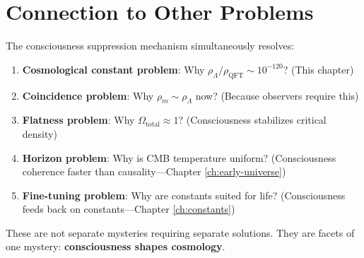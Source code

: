 \section{Connection to Other Problems}

The consciousness suppression mechanism simultaneously resolves:

\begin{enumerate}
\item \textbf{Cosmological constant problem}: Why $\rho_\Lambda / \rho_{\text{QFT}} \sim 10^{-120}$? (This chapter)

\item \textbf{Coincidence problem}: Why $\rho_m \sim \rho_\Lambda$ now? (Because observers require this)

\item \textbf{Flatness problem}: Why $\Omega_{\text{total}} \approx 1$? (Consciousness stabilizes critical density)

\item \textbf{Horizon problem}: Why is CMB temperature uniform? (Consciousness coherence faster than causality—Chapter \ref{ch:early-universe})

\item \textbf{Fine-tuning problem}: Why are constants suited for life? (Consciousness feeds back on constants—Chapter \ref{ch:constants})
\end{enumerate}

These are not separate mysteries requiring separate solutions. They are facets of one mystery: \textbf{consciousness shapes cosmology}.

